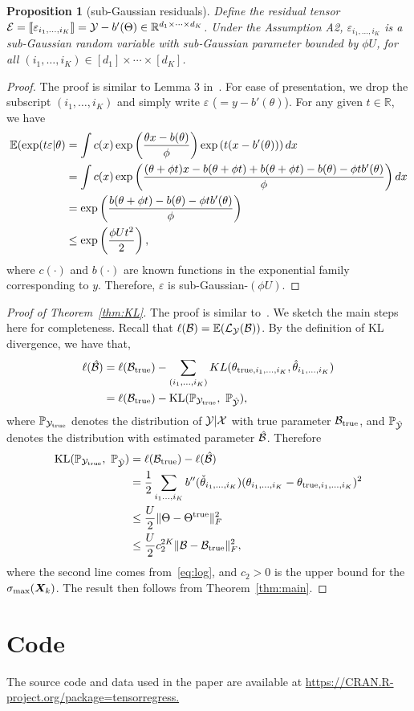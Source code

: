 \documentclass[12pt]{article}
\theoremstyle{plain}
\newtheorem{prop}{Proposition}
\theoremstyle{definition}
\begin{document}
\begin{prop}[sub-Gaussian residuals]\label{prop}
Define the residual tensor $\mathcal{E}=\llbracket \varepsilon_{i_1,\ldots,i_K} \rrbracket=\mathcal{Y}-b'(\Theta)\in\mathbb{R}^{d_1\times \cdots \times d_K}$. Under the Assumption A2, $\varepsilon_{i_1,\ldots,i_K}$ is a sub-Gaussian random variable with sub-Gaussian parameter bounded by $\phi U$, for all $(i_1,\ldots,i_K)\in[d_1]\times\cdots\times[d_K]$.
\end{prop}
\begin{proof} The proof is similar to Lemma 3 in~\citep{fan2019generalized}. For ease of presentation, we drop the subscript $(i_1,\ldots,i_K)$ and simply write $\varepsilon$ ($=y-b'(\theta)$). For any given $t\in\mathbb{R}$, we have
\begin{align}
\mathbb{E}(\exp(t\varepsilon|\theta)&=\int c(x) \exp\left({\theta x - b(\theta)\over \phi}   \right)\exp \left(t(x-b'(\theta))\right)dx\\
&=\int c(x)\exp \left( {(\theta + \phi t)x - b (\theta+\phi t)+b(\theta+\phi t)-b(\theta)-\phi t b'(\theta) \over \phi}\right)dx\\
&=\exp\left( {b(\theta+\phi t)-b(\theta)-\phi t b'(\theta) \over \phi} \right)\\
&\leq \exp\left(\phi U t^2\over 2 \right),
\end{align}
where $c(\cdot)$ and $b(\cdot)$ are known functions in the exponential family corresponding to $y$. 
Therefore, $\varepsilon$ is sub-Gaussian-$(\phi U)$. 
\end{proof}

\begin{proof}[Proof of Theorem~\ref{thm:KL}]
The proof is similar to~\citep{baldin2018optimal}. We sketch the main steps here for completeness. Recall that $\ell(\mathcal{B})=\mathbb{E}(\mathcal{L}_{\mathcal{Y}}(\mathcal{B}))$. By the definition of KL divergence, we have that,
\begin{align}
\ell(\hat \tB)&=\ell(\trueB)-\sum_{(i_1,\ldots,i_K)} KL(\theta_{\text{true}, i_1,\ldots, i_K}, \hat \theta_{i_1,\ldots,i_K})\\
&=\ell(\trueB)-\text{KL}(\mathbb{P}_{\tY_{\text{true}}},\ \mathbb{P}_{\hat \tY}),
\end{align}
where $\mathbb{P}_{\mathcal{Y}_{\text{true}}}$ denotes the distribution of $\mathcal{Y}|\mathcal{X}$ with true parameter $\mathcal{B}_{\text{true}}$, and $\mathbb{P}_{\hat {\mathcal{Y}}}$ denotes the distribution with estimated parameter $\hat {\mathcal{B}}$. Therefore
\begin{align}
\text{KL}(\mathbb{P}_{\mathcal{Y}_{\text{true}}},\ \mathbb{P}_{\hat {\mathcal{Y}}}) &= \ell(\mathcal{B}_{\text{true}})-\ell(\hat {\mathcal{B}})\\
&={1\over 2}\sum_{i_1\ldots,i_K}b''(\check \theta_{i_1,\ldots,i_K})(\theta_{i_1,\ldots,i_K}-\theta_{\text{true},i_1,\ldots,i_K})^2\\
&\leq {U\over 2} \lVert\Theta-\Theta^{\text{true}}\rVert_F^2\\
&\leq {U \over 2}c^{2K}_2\lVert\mathcal{B}-\mathcal{B}_{\text{true}}\rVert_F^2,
\end{align}
where the second line comes from~\eqref{eq:log}, and $c_2>0$ is the upper bound for the $\sigma_{\max}(\bm X_k)$. The result then follows from Theorem~\ref{thm:main}.
\end{proof}



\section{Code}
The source code and data used in the paper are available at \url{https://CRAN.R-project.org/package=tensorregress.}
\end{document}
